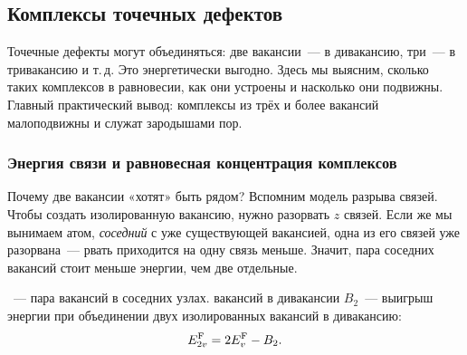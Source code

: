 \subsection{Комплексы точечных дефектов}\label{ssec:complexes}

\begin{orientir}
Точечные дефекты могут объединяться: две вакансии~— в дивакансию, три~—
в тривакансию и т.\,д. Это энергетически выгодно. Здесь мы выясним,
сколько таких комплексов в равновесии, как они устроены и насколько они
подвижны. Главный практический вывод: комплексы из трёх и более вакансий
малоподвижны и служат зародышами пор.
\end{orientir}

\subsubsection{Энергия связи и равновесная концентрация комплексов}

Почему две вакансии «хотят» быть рядом? Вспомним модель разрыва связей.
Чтобы создать изолированную вакансию, нужно разорвать $z$ связей. Если же
мы вынимаем атом, \emph{соседний} с уже существующей вакансией, одна из
его связей уже разорвана~— рвать приходится на одну связь меньше. Значит,
пара соседних вакансий стоит меньше энергии, чем две отдельные.

\begin{opredelenie}
~— пара вакансий в соседних узлах. 
вакансий в дивакансии $B_2$~— выигрыш энергии при объединении двух
изолированных вакансий в дивакансию:
\begin{equation}\label{eq:E2v}
E_{2v}^{\mathrm F}=2E_{v}^{\mathrm{F}}-B_2 .
\end{equation}
\end{opredelenie}

